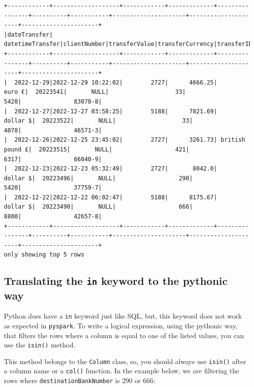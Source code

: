 \documentclass[
  11pt,
  letterpaper,
  DIV=11,
  numbers=noendperiod]{scrreprt}
\begin{document}
\begin{verbatim}
+------------+-------------------+------------+-------------+----------------+----------+-----------+---------------------+---------------------+----------------------+
|dateTransfer|   datetimeTransfer|clientNumber|transferValue|transferCurrency|transferID|transferLog|destinationBankNumber|destinationBankBranch|destinationBankAccount|
+------------+-------------------+------------+-------------+----------------+----------+-----------+---------------------+---------------------+----------------------+
|  2022-12-29|2022-12-29 10:22:02|        2727|      4666.25|          euro €|  20223541|       NULL|                   33|                 5420|               83070-8|
|  2022-12-27|2022-12-27 03:58:25|        5188|      7821.69|        dollar $|  20223522|       NULL|                   33|                 4078|               46571-3|
|  2022-12-26|2022-12-25 23:45:02|        2727|      3261.73| british pound £|  20223515|       NULL|                  421|                 6317|               66040-9|
|  2022-12-23|2022-12-23 05:32:49|        2727|       8042.0|        dollar $|  20223496|       NULL|                  290|                 5420|               37759-7|
|  2022-12-22|2022-12-22 06:02:47|        5188|      8175.67|        dollar $|  20223490|       NULL|                  666|                 8800|               42657-8|
+------------+-------------------+------------+-------------+----------------+----------+-----------+---------------------+---------------------+----------------------+
only showing top 5 rows
\end{verbatim}

\hypertarget{translating-the-in-keyword-to-the-pythonic-way}{%
\subsection{\texorpdfstring{Translating the \texttt{in} keyword to the
pythonic
way}{Translating the in keyword to the pythonic way}}\label{translating-the-in-keyword-to-the-pythonic-way}}

Python does have a \texttt{in} keyword just like SQL, but, this keyword
does not work as expected in \texttt{pyspark}. To write a logical
expression, using the pythonic way, that filters the rows where a column
is equal to one of the listed values, you can use the \texttt{isin()}
method.

This method belongs to the \texttt{Column} class, so, you should always
use \texttt{isin()} after a column name or a \texttt{col()} function. In
the example below, we are filtering the rows where
\texttt{destinationBankNumber} is 290 or 666:
\end{document}
